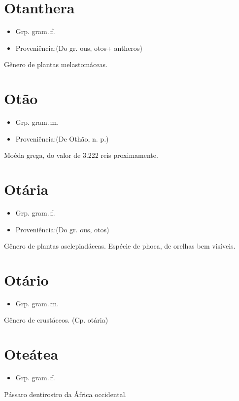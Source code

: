 \section{Otanthera}
\begin{itemize}
\item {Grp. gram.:f.}
\end{itemize}
\begin{itemize}
\item {Proveniência:(Do gr. \textunderscore ous\textunderscore , \textunderscore otos\textunderscore  + \textunderscore antheros\textunderscore )}
\end{itemize}
Gênero de plantas melastomáceas.
\section{Otão}
\begin{itemize}
\item {Grp. gram.:m.}
\end{itemize}
\begin{itemize}
\item {Proveniência:(De \textunderscore Othão\textunderscore , n. p.)}
\end{itemize}
Moéda grega, do valor de 3.222 reis proximamente.
\section{Otária}
\begin{itemize}
\item {Grp. gram.:f.}
\end{itemize}
\begin{itemize}
\item {Proveniência:(Do gr. \textunderscore ous\textunderscore , \textunderscore otos\textunderscore )}
\end{itemize}
Gênero de plantas asclepiadáceas.
Espécie de phoca, de orelhas bem visíveis.
\section{Otário}
\begin{itemize}
\item {Grp. gram.:m.}
\end{itemize}
Gênero de crustáceos.
(Cp. \textunderscore otária\textunderscore )
\section{Oteátea}
\begin{itemize}
\item {Grp. gram.:f.}
\end{itemize}
Pássaro dentirostro da África occidental.
